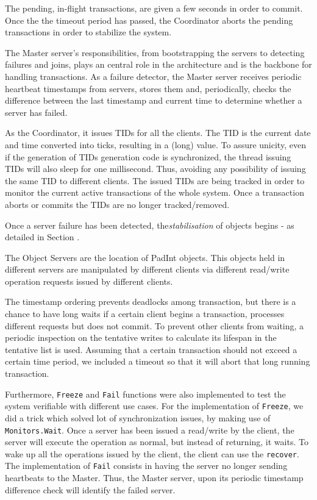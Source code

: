 \documentclass[times, 10pt,twocolumn]{article}
\begin{document}
The pending, in-flight transactions, are given a few seconds in order to commit. 
Once the the timeout period has passed, the Coordinator aborts the pending transactions in order to 
stabilize the system.

\label{subsec:respon}
The Master server's responsibilities, from bootstrapping the servers to detecting failures and joins,
 plays an central role in the architecture and is the backbone for handling transactions.
As a failure detector, the Master server receives periodic heartbeat timestamps from servers, stores them and, periodically,
 checks the difference between the last timestamp and current time to determine whether a server has failed.

As the Coordinator, it issues TIDs for all the clients. The TID is the current date and time converted into ticks, resulting in a 
(long) value. To assure unicity, even if the generation of TIDs generation code is synchronized, the thread
issuing TIDs will also sleep for one millisecond. Thus, avoiding any possibility of issuing the same TID to different clients.
The issued TIDs are being tracked in order to monitor the current active transactions of the whole system. 
Once a transaction aborts or commits the TIDs are no longer tracked/removed. 

Once a server failure has been detected, the{\it stabilisation} of objects begins - as detailed in
Section \cite{subsec:grmemb}.

\label{subsec:objserv}
The Object Servers are the location of PadInt objects. This objects held in different servers
are manipulated by different clients via different read/write operation requests issued by 
different clients.

The timestamp ordering prevents deadlocks among transaction, but there is a chance to have
long waits if a certain client begins a transaction, processes different requests but does not 
commit. To prevent other clients from waiting, a periodic inspection on the tentative writes to calculate
its lifespan in the tentative list is used. Assuming that a certain transaction should not exceed
a certain time period, we included a timeout so that it will abort that long running transaction. 

Furthermore, \texttt{Freeze} and \texttt{Fail} functions were also implemented to test the system verifiable with different use cases. 
For the implementation of \texttt{Freeze}, we did a trick which solved lot of synchronization issues, by
 making use of \texttt{Monitors.Wait}. Once a server has been issued a read/write by the client, 
the server will execute the operation as normal, but instead of returning, it waits. 
To wake up all the operations issued by the client, the client can use the \texttt{recover}.
The implementation of \texttt{Fail} consists in having the server no longer sending heartbeats to the Master.
Thus, the Master server, upon its periodic timestamp difference check will identify the failed server.
 
\end{document}
